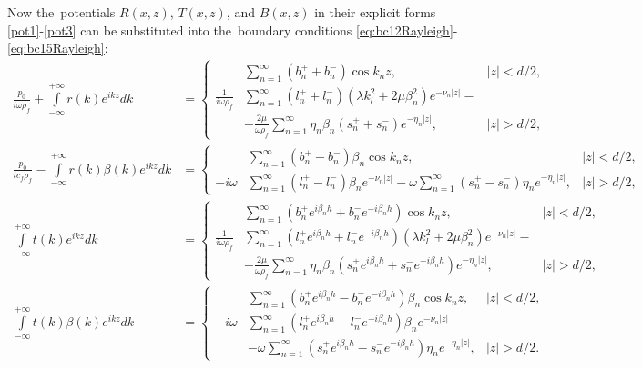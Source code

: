 Now the~potentials $R(x,z)$, $T(x,z)$, and $B(x,z)$ in their explicit forms \cref{pot1}-\cref{pot3} can be substituted into the~boundary conditions \cref{eq:bc12Rayleigh}-\cref{eq:bc15Rayleigh}:
\begin{align}
\frac{p_0}{i\omega\rho_f}+ \int\limits_{-\infty}^{+\infty}r(k)e^{ikz}dk &= 
\left\{
\begin{aligned}
 & \sum\limits_{n=1}^{\infty}({b_n^+}+{b_n^-})\cos{k_nz},  &|z|<d/2, \\
\frac{1}{i\omega\rho_f} & \sum\limits_{n=1}^{\infty}
({l_n^+}+{l_n^-})\left(\lambda k_l^2+2\mu\beta_n^2\right)e^{-\nu_n |z|}-\\&-\frac{2\mu}{\omega\rho_f} \sum\limits_{n=1}^{\infty} \eta_n\beta_n ({s_n^+}+{s_n^-}) e^{-\eta_n |z|}, &|z|>d/2,
\end{aligned}
\right. \label{eq:16Rayleigh} \\
\frac{p_0}{ic_f\rho_f}- \int\limits_{-\infty}^{+\infty}r(k)\beta(k)e^{ikz}dk &= 
\left\{
\begin{aligned}
& \sum\limits_{n=1}^{\infty}({b_n^+}-{b_n^-})\beta_n\cos{k_nz}, &|z|<d/2, \\
-i\omega & \sum\limits_{n=1}^{\infty}
({l_n^+}-{l_n^-})\beta_n e^{-\nu_n |z|}-\omega\sum\limits_{n=1}^{\infty}({s_n^+}-{s_n^-})\eta_n e^{-\eta_n |z|}, &|z|>d/2,
\end{aligned}
\right. \label{eq:17Rayleigh} \\
\int\limits_{-\infty}^{+\infty}t(k)e^{ikz}dk &= 
\left\{
\begin{aligned}
&\sum\limits_{n=1}^{\infty}({b_n^+}e^{i\beta_nh}+{b_n^-}e^{-i\beta_nh})\cos{k_nz}, &|z|<d/2,\\
\frac{1}{i\omega\rho_f} & \sum\limits_{n=1}^{\infty}
({l_n^+}e^{i\beta_nh}+{l_n^-}e^{-i\beta_nh})\left(\lambda k_l^2+2\mu\beta_n^2\right)e^{-\nu_n |z|} -\\
& -\frac{2\mu}{\omega \rho_f} \sum\limits_{n=1}^{\infty} \eta_n\beta_n ({s_n^+}e^{i\beta_nh}+{s_n^-}e^{-i\beta_nh}) e^{-\eta_n |z|}, &|z|>d/2,
\end{aligned}
\right. \label{eq:18Rayleigh} \\
\int\limits_{-\infty}^{+\infty}t(k)\beta(k)e^{ikz}dk &= 
\left\{
\begin{aligned}
& \sum\limits_{n=1}^{\infty}({b_n^+}e^{i\beta_nh}-{b_n^-}e^{-i\beta_nh})\beta_n\cos{k_nz}, &|z|<d/2,  \\
-i\omega & \sum\limits_{n=1}^{\infty}
({l_n^+}e^{i\beta_nh}-{l_n^-}e^{-i\beta_nh})\beta_n e^{-\nu_n |z|}-\\&-\omega\sum\limits_{n=1}^{\infty}({s_n^+}e^{i\beta_nh}-{s_n^-}e^{-i\beta_nh})\eta_n e^{-\eta_n |z|}, &|z|>d/2.
\end{aligned}
\right. \label{eq:19Rayleigh}
\end{align}

